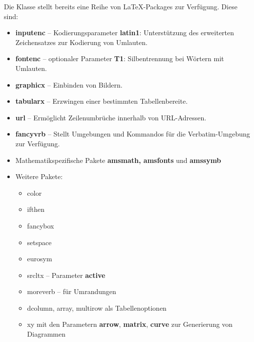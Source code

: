 Die Klasse stellt bereits eine Reihe von \LaTeX-Packages zur
Verfügung. Diese sind:
\begin{itemize}
  \item{\textbf{inputenc} -- Kodierungsparameter \textbf{latin1}}: Unterstützung des erweiterten Zeichensatzes zur Kodierung von Umlauten.

  \item{\textbf{fontenc} -- optionaler Parameter \textbf{T1}}: Silbentrennung bei Wörtern mit Umlauten.

  \item{\textbf{graphicx}} -- Einbinden von Bildern.

  \item{\textbf{tabularx}} -- Erzwingen einer bestimmten Tabellenbereite.

  \item{\textbf{url}} -- Ermöglicht Zeilenumbrüche innerhalb von URL-Adressen.

  \item{\textbf{fancyvrb}} -- Stellt Umgebungen und Kommandos für die Verbatim-Umgebung zur Verfügung.

  \item{Mathematikspezifische Pakete \textbf{amsmath, amsfonts} und \textbf{amssymb}}

  \item{Weitere Pakete}:

    \begin{itemize}

        \item{color}

        \item{ifthen}

        \item{fancybox}

        \item{setspace}

        \item{eurosym}

        \item{srcltx} -- Parameter \textbf{active}

        \item{moreverb} -- für Umrandungen

        \item{dcolumn, array, multirow als Tabellenoptionen}

        \item{xy mit den Parametern \textbf{arrow}, \textbf{matrix}, \textbf{curve} zur Generierung von Diagrammen}


\end{itemize}
\end{itemize}
